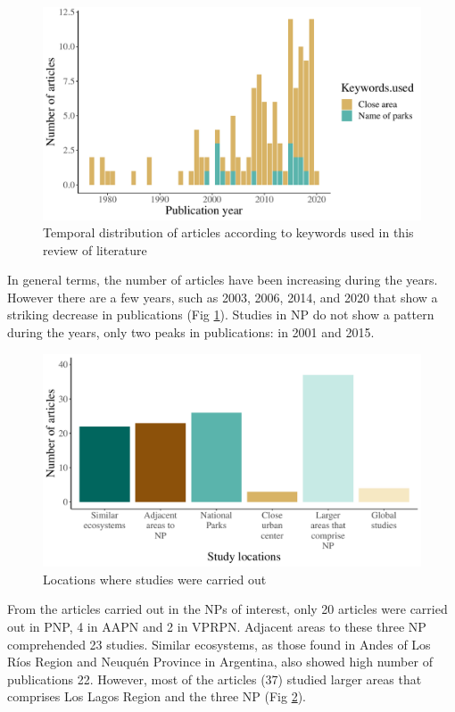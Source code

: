 \documentclass[]{article}
\begin{document}
\begin{figure}
\centering
\includegraphics{Review_and_climate_files/figure-latex/Years-1.pdf}
\caption{\label{fig:Years}Temporal distribution of articles according to keywords used in this review of literature}
\end{figure}

In general terms, the number of articles have been increasing during the years. However there are a few years, such as 2003, 2006, 2014, and 2020 that show a striking decrease in publications (Fig \ref{fig:Years}). Studies in NP do not show a pattern during the years, only two peaks in publications: in 2001 and 2015.

\begin{figure}
\centering
\includegraphics{Review_and_climate_files/figure-latex/Locations-1.pdf}
\caption{\label{fig:Locations}Locations where studies were carried out}
\end{figure}

From the articles carried out in the NPs of interest, only 20 articles were carried out in PNP, 4 in AAPN and 2 in VPRPN.
Adjacent areas to these three NP comprehended 23 studies. Similar ecosystems, as those found in Andes of Los Ríos Region and Neuquén Province in Argentina, also showed high number of publications 22. However, most of the articles (37) studied larger areas that comprises Los Lagos Region and the three NP (Fig \ref{fig:Locations}).
\end{document}
